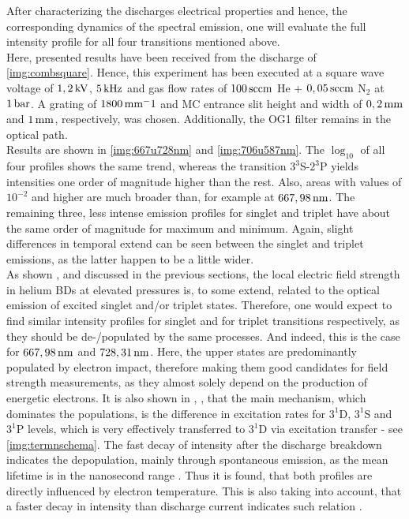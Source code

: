 \documentclass[a4paper,10pt,twoside]{article}
\newcommand{\tenpo}[1]{ 10^{#1}}
\newcommand{\ix}[1]{_\text{#1}}
\begin{document}
		After characterizing the discharges electrical properties and hence, the corresponding dynamics of the spectral emission, one will evaluate the full intensity profile for all four transitions mentioned above.\\
		Here, presented results have been received from the discharge of \autoref{img:combsquare}. Hence, this experiment has been executed at a square wave voltage of $\unit[1,2]{kV}$, $\unit[5]{kHz}$ and gas flow rates of $\unit[100]{sccm}$ He + $\unit[0,05]{sccm}$ N$_2$ at $\unit[1]{bar}$. A grating of $\unit[1800]{mm^-1}$ and MC entrance slit height and width of $\unit[0,2]{mm}$ and $\unit[1]{mm}$, respectively, was chosen. Additionally, the OG1 filter remains in the optical path.\\
		Results are shown in \autoref{img:667u728nm} and \autoref{img:706u587nm}. The $\log\ix{10}$ of all four profiles shows the same trend, whereas the transition $3^3$S-$2^3$P yields intensities one order of magnitude higher than the rest. Also, areas with values of $\tenpo{-2}$ and higher are much broader than, for example at $\unit[667,98]{nm}$. The remaining three, less intense emission profiles for singlet and triplet have about the same order of magnitude for maximum and minimum. Again, slight differences in temporal extend can be seen between the singlet and triplet emissions, as the latter happen to be a little wider.\\
		As shown \cite{linratio1_14}, \cite{lineratio2_14} and discussed in the previous sections, the local electric field strength in helium BDs at elevated pressures is, to some extend, related to the optical emission of excited singlet and/or triplet states. Therefore, one would expect to find similar intensity profiles for singlet and for triplet transitions respectively, as they should be de-/populated by the same processes. And indeed, this is the case for $\unit[667,98]{nm}$ and $\unit[728,31]{nm}$. Here, the upper states are predominantly populated by electron impact, therefore making them good candidates for field strength measurements, as they almost solely depend on the production of energetic electrons. It is also shown in \cite{linratio1_14}, \cite{belmonte}, \cite{debreuil} that the main mechanism, which dominates the populations, is the difference in excitation rates for $3^1$D, $3^1$S and $3^1$P levels, which is very effectively transferred to $3^1$D via excitation transfer - see \autoref{img:termnschema}. The fast decay of intensity after the discharge breakdown indicates the depopulation, mainly through spontaneous emission, as the mean lifetime is in the nanosecond range \cite{linratio1_14}. Thus it is found, that both profiles are directly influenced by electron temperature. This is also taking into account, that a faster decay in intensity than discharge current indicates such relation \cite{electron_temp}.\\
\end{document}
